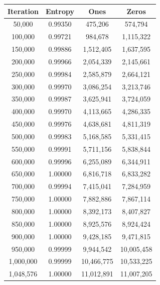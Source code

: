 \documentclass[preprint,natbib]{sigplanconf}
\begin{document}
\noindent
\begin{minipage}{\columnwidth}
    \setlength{\tabcolsep}{.35\tabcolsep}
    \centering
    \begin{tabular}{|c|c|c|c|}
        \hline
        \textbf{Iteration} & \textbf{Entropy} & \textbf{Ones} & \textbf{Zeros} \\
        \hline
        50,000             & 0.99350          & 475,206       & 574,794        \\
        100,000            & 0.99721          & 984,678       & 1,115,322      \\
        150,000            & 0.99886          & 1,512,405     & 1,637,595      \\
        200,000            & 0.99966          & 2,054,339     & 2,145,661      \\
        250,000            & 0.99984          & 2,585,879     & 2,664,121      \\
        300,000            & 0.99970          & 3,086,254     & 3,213,746      \\
        350,000            & 0.99987          & 3,625,941     & 3,724,059      \\
        400,000            & 0.99970          & 4,113,665     & 4,286,335      \\
        450,000            & 0.99976          & 4,638,681     & 4,811,319      \\
        500,000            & 0.99983          & 5,168,585     & 5,331,415      \\
        550,000            & 0.99991          & 5,711,156     & 5,838,844      \\
        600,000            & 0.99996          & 6,255,089     & 6,344,911      \\
        650,000            & 1.00000          & 6,816,718     & 6,833,282      \\
        700,000            & 0.99994          & 7,415,041     & 7,284,959      \\
        750,000            & 1.00000          & 7,882,886     & 7,867,114      \\
        800,000            & 1.00000          & 8,392,173     & 8,407,827      \\
        850,000            & 1.00000          & 8,925,576     & 8,924,424      \\
        900,000            & 1.00000          & 9,428,185     & 9,471,815      \\
        950,000            & 0.99999          & 9,944,542     & 10,005,458     \\
        1,000,000          & 0.99999          & 10,466,775    & 10,533,225     \\
        1,048,576          & 1.00000          & 11,012,891    & 11,007,205     \\
        \hline
    \end{tabular}
\end{minipage}
\end{document}
